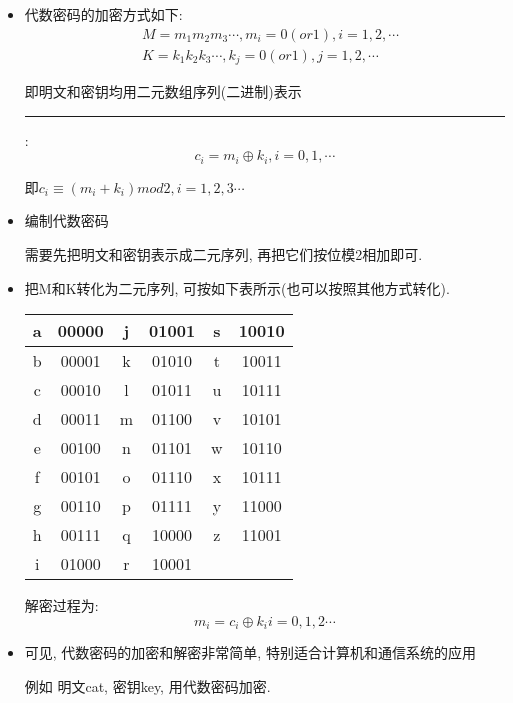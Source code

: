 \documentclass[UTF8]{ctexart}
\newcommand\hl{\bgroup\markoverwith
  {\textcolor{yellow}{\rule[-.5ex]{2pt}{2.5ex}}}\ULon}
\begin{document}
    \begin{itemize}
        \item 代数密码的加密方式如下:
        $$
        \begin{aligned}
            &M=m_1m_2m_3\cdots, m_i=0(or 1), i=1,2,\cdots\\
            &K=k_1k_2k_3\cdots, k_j=0(or 1), j=1,2,\cdots
        \end{aligned}
        $$

        即明文和密钥均用二元数组序列(二进制)表示

        \hl{加密过程如下}:
        $$c_i=m_i\oplus k_i, i=0, 1, \cdots$$

        即$c_i\equiv (m_i+k_i) mod 2, i=1,2,3 \cdots$

        \item 编制代数密码

        需要先把明文和密钥表示成二元序列, 再把它们按位模2相加即可.

        \item 把M和K转化为二元序列, 可按如下表所示(也可以按照其他方式转化).

        \begin{tabular}{|c|c||c|c||c|c|}
            \hline
            a &00000 &j &01001 &s &10010\\
            \hline
            b &00001 &k &01010 &t &10011\\
            \hline
            c &00010 &l &01011 &u &10111\\
            \hline
            d &00011 &m &01100 &v &10101\\
            \hline
            e &00100 &n &01101 &w &10110\\
            \hline
            f &00101 &o &01110 &x &10111\\
            \hline
            g &00110 &p &01111 &y &11000\\
            \hline
            h &00111 &q &10000 &z &11001\\
            \hline
            i &01000 &r &10001 & & \\
            \hline
        \end{tabular}

        解密过程为:
        $$m_i = c_i\oplus k_i i=0, 1, 2\cdots$$

        \item 可见, 代数密码的加密和解密非常简单, 特别适合计算机和通信系统的应用

        例如 明文cat, 密钥key, 用代数密码加密.


\end{itemize}
\end{document}
